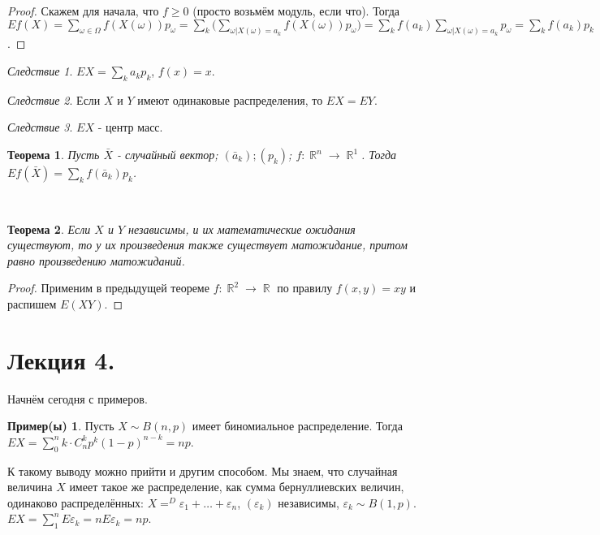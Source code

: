 \documentclass[a4paper,100pt]{article}
\theoremstyle{indented}
\newtheorem{theorem}{Теорема}
\theoremstyle{definition}
\newtheorem{exl}{Пример(ы)}
\theoremstyle{remark}
\newtheorem{cons}{Следствие}
\DeclareMathOperator{\RR}{\mathbb{R}}
\begin{document}
\begin{proof}
    Скажем для начала, что $f\geq 0$ (просто возьмём модуль, если что). Тогда $E f(X)=\sum_{\omega \in \Omega} f(X(\omega))p_\omega = \sum_k \biggl( \sum_{\omega|X(\omega) = a_k} f(X(\omega)) p_\omega\biggr) = \sum_k f(a_k) \sum_{\omega | X(\omega)=a_k}p_\omega = \sum_k f(a_k)p_k$. 
\end{proof}

\begin{cons}
    $EX=\sum_k a_k p_k$, $f(x)=x$. 
\end{cons}

\begin{cons}
    Если $X$ и $Y$ имеют одинаковые распределения, то $EX=EY$. 
\end{cons}

\begin{cons}
    $EX$ - центр масс.
\end{cons}

\begin{theorem}
    Пусть $\bar{X}$ - случайный вектор; $(\bar{a}_k); (p_k)$; $f:\RR^n \rightarrow \RR^1$. Тогда $Ef(\bar{X}) = \sum_k f(\bar{a}_k)p_k$. 
\end{theorem} \

\begin{theorem}
    Если $X$ и $Y$ независимы, и их математические ожидания существуют, то у их произведения также существует матожидание, притом равно произведению матожиданий.
\end{theorem}

\begin{proof}
    Применим в предыдущей теореме $f: \RR^2 \rightarrow \RR$ по правилу $f(x, y)=xy$ и распишем $E(XY)$. 
\end{proof}

\section{Лекция 4.}

Начнём сегодня с примеров. 

\begin{exl}
    Пусть $X \sim B(n, p)$ имеет биномиальное распределение. Тогда $EX=\sum_0^n k\cdot C_n^kp^k(1-p)^{n-k}=np$. \ 

    К такому выводу можно прийти и другим способом. Мы знаем, что случайная величина $X$ имеет такое же распределение, как сумма бернуллиевских величин, одинаково распределённых: $X=^D\varepsilon_1+\ldots+\varepsilon_n$, $(\varepsilon_k)$ независимы, $\varepsilon_k\sim B(1, p)$. $EX=\sum_1^n E\varepsilon_k=n E\varepsilon_k = np$. 
\end{exl}
\end{document}
